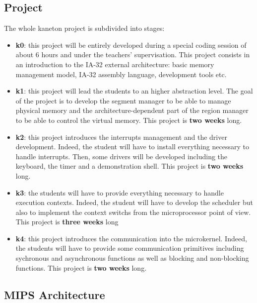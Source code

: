 \begin{multicols}{2}
%
%

\subsection{Project}

The whole kaneton project is subdivided into stages:

\begin{itemize}
  \item
    \textbf{k0}: this project will be entirely developed during a
    special coding session of about 6 hours and under the teachers'
    supervisation. This project consists in an introduction to the
    IA-32 external architecture: basic memory management model,
    IA-32 assembly language, development tools etc.
  \item
    \textbf{k1}: this project will lead the students to an higher abstraction
    level. The goal of the project is to develop the segment manager to be
    able to manage physical memory and the architecture-dependent part of the
    region manager to be able to control the virtual memory. This project
    is \textbf{two weeks} long.
  \item
    \textbf{k2}: this project introduces the interrupts management and
    the driver development. Indeed, the student will have to install
    everything necessary to handle interrupts. Then, some drivers will
    be developed including the keyboard, the timer and a demonstration shell.
    This project is \textbf{two weeks} long.
  \item
    \textbf{k3}: the students will have to provide everything necessary
    to handle execution contexts. Indeed, the student will have to
    develop the scheduler but also to implement the context switchs from
    the microprocessor point of view. This project is \textbf{three weeks}
    long
  \item
    \textbf{k4}: this project introduces the communication into the
    microkernel. Indeed, the students will have to provide some
    communication primitives including sychronous and asynchronous
    functions as well as blocking and non-blocking functions. This project
    is \textbf{two weeks} long.
\end{itemize}

%
%

\subsection{MIPS Architecture}


\end{multicols}
